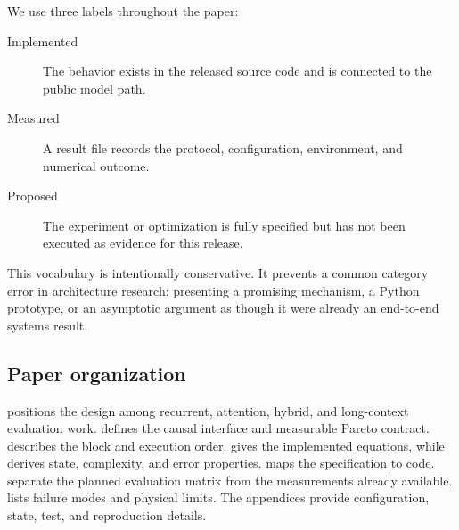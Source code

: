 We use three labels throughout the paper:

\begin{description}
  \item[Implemented] The behavior exists in the released source code and is
  connected to the public model path.
  \item[Measured] A result file records the protocol, configuration,
  environment, and numerical outcome.
  \item[Proposed] The experiment or optimization is fully specified but has
  not been executed as evidence for this release.
\end{description}

This vocabulary is intentionally conservative. It prevents a common category
error in architecture research: presenting a promising mechanism, a Python
prototype, or an asymptotic argument as though it were already an end-to-end
systems result.

\subsection{Paper organization}

 positions the design among recurrent, attention,
hybrid, and long-context evaluation work.  defines
the causal interface and measurable Pareto contract. 
describes the block and execution order.  gives the
implemented equations, while  derives state, complexity, and
error properties.  maps the specification to code.
 separate the planned evaluation matrix from
the measurements already available.  lists failure
modes and physical limits. The appendices provide configuration, state, test,
and reproduction details.
